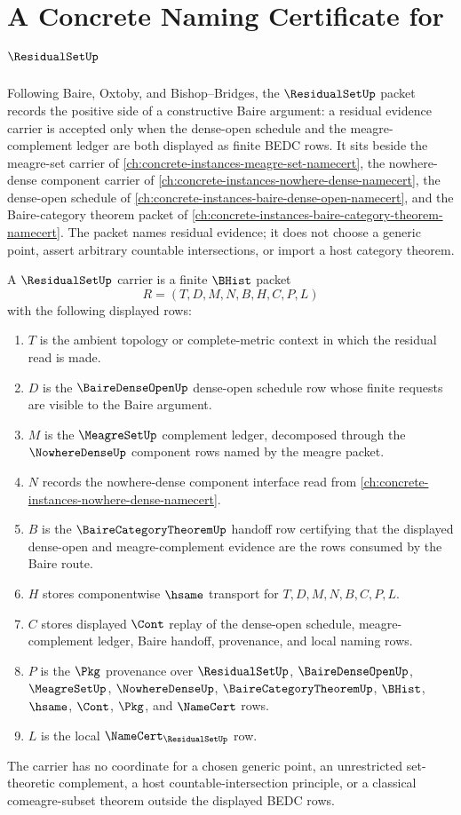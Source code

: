 \chapter{A Concrete Naming Certificate for $\ResidualSetUp$}
\label{ch:concrete-instances-residual-set-namecert}

Following Baire, Oxtoby, and Bishop--Bridges, the $\ResidualSetUp$ packet records the positive side of a constructive Baire argument: a residual evidence carrier is accepted only when the dense-open schedule and the meagre-complement ledger are both displayed as finite BEDC rows. It sits beside the meagre-set carrier of \autoref{ch:concrete-instances-meagre-set-namecert}, the nowhere-dense component carrier of \autoref{ch:concrete-instances-nowhere-dense-namecert}, the dense-open schedule of \autoref{ch:concrete-instances-baire-dense-open-namecert}, and the Baire-category theorem packet of \autoref{ch:concrete-instances-baire-category-theorem-namecert}. The packet names residual evidence; it does not choose a generic point, assert arbitrary countable intersections, or import a host category theorem.

\begin{definition}
\label{def:residual-set-carrier}
A $\ResidualSetUp$ carrier is a finite $\BHist$ packet
$$
R=(T,D,M,N,B,H,C,P,L)
$$
with the following displayed rows:
\begin{enumerate}
\item $T$ is the ambient topology or complete-metric context in which the residual read is made.
\item $D$ is the $\BaireDenseOpenUp$ dense-open schedule row whose finite requests are visible to the Baire argument.
\item $M$ is the $\MeagreSetUp$ complement ledger, decomposed through the $\NowhereDenseUp$ component rows named by the meagre packet.
\item $N$ records the nowhere-dense component interface read from \autoref{ch:concrete-instances-nowhere-dense-namecert}.
\item $B$ is the $\BaireCategoryTheoremUp$ handoff row certifying that the displayed dense-open and meagre-complement evidence are the rows consumed by the Baire route.
\item $H$ stores componentwise $\hsame$ transport for $T,D,M,N,B,C,P,L$.
\item $C$ stores displayed $\Cont$ replay of the dense-open schedule, meagre-complement ledger, Baire handoff, provenance, and local naming rows.
\item $P$ is the $\Pkg$ provenance over $\ResidualSetUp$, $\BaireDenseOpenUp$, $\MeagreSetUp$, $\NowhereDenseUp$, $\BaireCategoryTheoremUp$, $\BHist$, $\hsame$, $\Cont$, $\Pkg$, and $\NameCert$ rows.
\item $L$ is the local $\NameCert_{\ResidualSetUp}$ row.
\end{enumerate}
The carrier has no coordinate for a chosen generic point, an unrestricted set-theoretic complement, a host countable-intersection principle, or a classical comeagre-subset theorem outside the displayed BEDC rows.
\end{definition}

